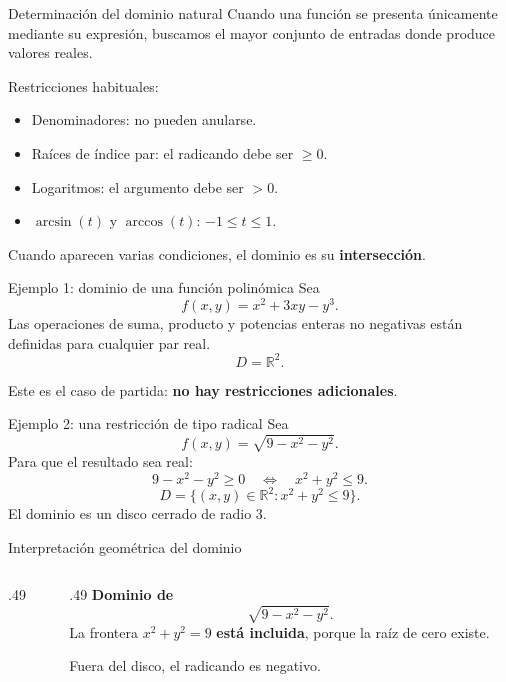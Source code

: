 \documentclass[main.tex]{subfiles}
\begin{document}
\begin{frame}{Determinación del dominio natural}
Cuando una función se presenta únicamente mediante su expresión, buscamos el mayor conjunto de entradas donde produce valores reales.
\medskip

Restricciones habituales:
\begin{itemize}
  \item Denominadores: no pueden anularse.
  \item Raíces de índice par: el radicando debe ser $\geq0$.
  \item Logaritmos: el argumento debe ser $>0$.
  \item $\arcsin(t)$ y $\arccos(t)$: $-1\leq t\leq1$.
\end{itemize}
\medskip

Cuando aparecen varias condiciones, el dominio es su \textbf{intersección}.
\end{frame}

\begin{frame}{Ejemplo 1: dominio de una función polinómica}
Sea
\[
f(x,y)=x^2+3xy-y^3.
\]
Las operaciones de suma, producto y potencias enteras no negativas están definidas para cualquier par real.
\[
\boxed{D=\mathbb R^2.}
\]
\medskip

Este es el caso de partida: \textbf{no hay restricciones adicionales}.
\end{frame}

\begin{frame}{Ejemplo 2: una restricción de tipo radical}
Sea
\[
f(x,y)=\sqrt{9-x^2-y^2}.
\]
Para que el resultado sea real:
\[
9-x^2-y^2\geq0
\quad\Longleftrightarrow\quad x^2+y^2\leq9.
\]
\[
\boxed{D=\{(x,y)\in\mathbb R^2:x^2+y^2\leq9\}.}
\]
El dominio es un disco cerrado de radio $3$.
\end{frame}

\begin{frame}{Interpretación geométrica del dominio}
\begin{columns}[c]
  \begin{column}{.49\textwidth}
    \centering
  \end{column}
  \begin{column}{.49\textwidth}
    \textbf{Dominio de}
    \[
      \sqrt{9-x^2-y^2}.
    \]
    La frontera $x^2+y^2=9$ \textbf{está incluida}, porque la raíz de cero existe.
    \medskip

    Fuera del disco, el radicando es negativo.
  \end{column}
\end{columns}
\end{frame}
\end{document}
